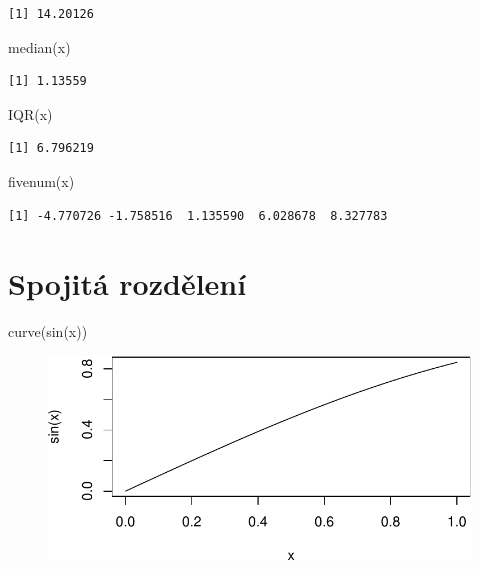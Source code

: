 \documentclass[
  letterpaper,
  DIV=11,
  numbers=noendperiod]{scrreprt}
\newenvironment{Shaded}{\begin{snugshade}}{\end{snugshade}}
\newcommand{\FunctionTok}[1]{\textcolor[rgb]{0.28,0.35,0.67}{#1}}
\newcommand{\NormalTok}[1]{\textcolor[rgb]{0.00,0.23,0.31}{#1}}
\begin{document}
\begin{verbatim}
[1] 14.20126
\end{verbatim}

\begin{Shaded}
\begin{Highlighting}[]
\FunctionTok{median}\NormalTok{(x)}
\end{Highlighting}
\end{Shaded}

\begin{verbatim}
[1] 1.13559
\end{verbatim}

\begin{Shaded}
\begin{Highlighting}[]
\FunctionTok{IQR}\NormalTok{(x)}
\end{Highlighting}
\end{Shaded}

\begin{verbatim}
[1] 6.796219
\end{verbatim}

\begin{Shaded}
\begin{Highlighting}[]
\FunctionTok{fivenum}\NormalTok{(x)}
\end{Highlighting}
\end{Shaded}

\begin{verbatim}
[1] -4.770726 -1.758516  1.135590  6.028678  8.327783
\end{verbatim}

\hypertarget{spojituxe1-rozdux11blenuxed-1}{%
\section{Spojitá rozdělení}\label{spojituxe1-rozdux11blenuxed-1}}

\begin{Shaded}
\begin{Highlighting}[]
\FunctionTok{curve}\NormalTok{(}\FunctionTok{sin}\NormalTok{(x))}
\end{Highlighting}
\end{Shaded}

\begin{figure}[H]

{\centering \includegraphics{10_hydro_index_files/figure-pdf/unnamed-chunk-3-1.pdf}

}

\end{figure}
\end{document}
